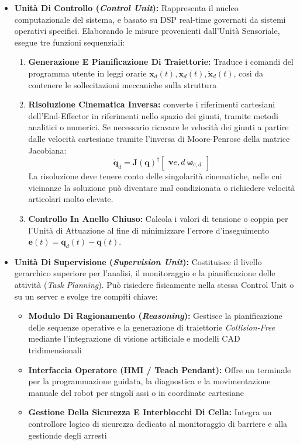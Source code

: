 ﻿\documentclass[11pt, a4paper]{article}
\begin{document}
\begin{itemize}
    \item \textbf{Unità Di Controllo (\textit{Control Unit}):}
    Rappresenta il nucleo computazionale del sistema, e basato su DSP real-time governati da sistemi operativi specifici. Elaborando le misure provenienti dall'Unità Sensoriale, esegue tre funzioni sequenziali:
    \begin{enumerate}
        \item \textbf{Generazione E Pianificazione Di Traiettorie:} Traduce i comandi del programma utente in leggi orarie $\boldsymbol{x}_d(t), \dot{\boldsymbol{x}}_d(t), \ddot{\boldsymbol{x}}_d(t)$, così da contenere le sollecitazioni meccaniche sulla struttura
        \item \textbf{Risoluzione Cinematica Inversa:} converte i riferimenti cartesiani dell'End-Effector in riferimenti nello spazio dei giunti, tramite metodi analitici o numerici. Se necessario ricavare le velocità dei giunti a partire dalle velocità cartesiane tramite l'inversa di Moore-Penrose della matrice Jacobiana:
        \[
            \dot{\boldsymbol{q}}_d =
            \boldsymbol{J}(\boldsymbol{q})^\dagger
            \begin{bmatrix}
                \boldsymbol{v}{e,d}\
                \boldsymbol{\omega}_{e,d}
            \end{bmatrix}
        \]
        La risoluzione deve tenere conto delle singolarità cinematiche, nelle cui vicinanze la soluzione può diventare mal condizionata o richiedere velocità articolari molto elevate.
        \item \textbf{Controllo In Anello Chiuso:} Calcola i valori di tensione o coppia per l'Unità di Attuazione al fine di minimizzare l'errore d'inseguimento $\boldsymbol{e}(t) = \boldsymbol{q}_d(t) - \boldsymbol{q}(t)$.
    \end{enumerate}

    \item \textbf{Unità Di Supervisione (\textit{Supervision Unit}):}
    Costituisce il livello gerarchico superiore per l'analisi, il monitoraggio e la pianificazione delle attività (\textit{Task Planning}). Può risiedere fisicamente nella stessa Control Unit o su un server e svolge tre compiti chiave:
    \begin{itemize}
        \item \textbf{Modulo Di Ragionamento (\textit{Reasoning}):} Gestisce la pianificazione delle sequenze operative e la generazione di traiettorie \textit{Collision-Free} mediante l'integrazione di visione artificiale e modelli CAD tridimensionali
        \item \textbf{Interfaccia Operatore (HMI / Teach Pendant):} Offre un terminale per la programmazione guidata, la diagnostica e la movimentazione manuale del robot per singoli assi o in coordinate cartesiane
        \item \textbf{Gestione Della Sicurezza E Interblocchi Di Cella:} Integra un controllore logico di sicurezza dedicato al monitoraggio di barriere e alla gestionde degli arresti
    \end{itemize}

\end{itemize}
\newpage
\end{document}
